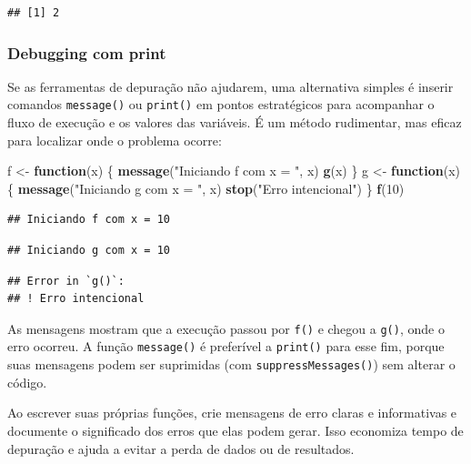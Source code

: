 \documentclass[
]{book}
\newenvironment{Shaded}{\begin{snugshade}}{\end{snugshade}}
\newcommand{\ControlFlowTok}[1]{\textcolor[rgb]{0.13,0.29,0.53}{\textbf{#1}}}
\newcommand{\DecValTok}[1]{\textcolor[rgb]{0.00,0.00,0.81}{#1}}
\newcommand{\FunctionTok}[1]{\textcolor[rgb]{0.13,0.29,0.53}{\textbf{#1}}}
\newcommand{\NormalTok}[1]{#1}
\newcommand{\OtherTok}[1]{\textcolor[rgb]{0.56,0.35,0.01}{#1}}
\newcommand{\StringTok}[1]{\textcolor[rgb]{0.31,0.60,0.02}{#1}}
\begin{document}
\begin{verbatim}
## [1] 2
\end{verbatim}

\subsubsection{Debugging com print}\label{debugging-com-print}

Se as ferramentas de depuração não ajudarem, uma alternativa simples é inserir comandos \texttt{message()} ou \texttt{print()} em pontos estratégicos para acompanhar o fluxo de execução e os valores das variáveis. É um método rudimentar, mas eficaz para localizar onde o problema ocorre:

\begin{Shaded}
\begin{Highlighting}[]
\NormalTok{f }\OtherTok{\textless{}{-}} \ControlFlowTok{function}\NormalTok{(x) \{}
  \FunctionTok{message}\NormalTok{(}\StringTok{"Iniciando f com x = "}\NormalTok{, x)}
  \FunctionTok{g}\NormalTok{(x)}
\NormalTok{\}}
\NormalTok{g }\OtherTok{\textless{}{-}} \ControlFlowTok{function}\NormalTok{(x) \{}
  \FunctionTok{message}\NormalTok{(}\StringTok{"Iniciando g com x = "}\NormalTok{, x)}
  \FunctionTok{stop}\NormalTok{(}\StringTok{"Erro intencional"}\NormalTok{)}
\NormalTok{\}}
\FunctionTok{f}\NormalTok{(}\DecValTok{10}\NormalTok{)}
\end{Highlighting}
\end{Shaded}

\begin{verbatim}
## Iniciando f com x = 10
\end{verbatim}

\begin{verbatim}
## Iniciando g com x = 10
\end{verbatim}

\begin{verbatim}
## Error in `g()`:
## ! Erro intencional
\end{verbatim}

As mensagens mostram que a execução passou por \texttt{f()} e chegou a \texttt{g()}, onde o erro ocorreu. A função \texttt{message()} é preferível a \texttt{print()} para esse fim, porque suas mensagens podem ser suprimidas (com \texttt{suppressMessages()}) sem alterar o código.

Ao escrever suas próprias funções, crie mensagens de erro claras e informativas e documente o significado dos erros que elas podem gerar. Isso economiza tempo de depuração e ajuda a evitar a perda de dados ou de resultados.
\end{document}

